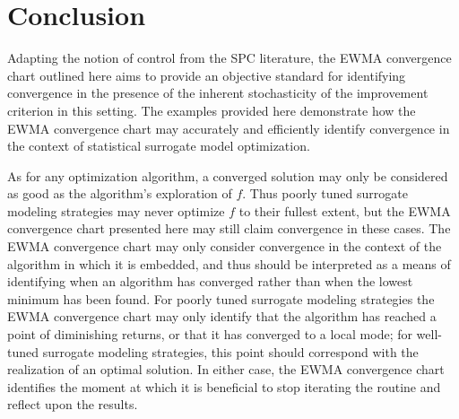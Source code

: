 \documentclass[12pt]{article}
\begin{document}
\clearpage
%
%
\section{Conclusion}
%
%

%
Adapting the notion of control from the SPC literature, the EWMA convergence chart outlined here aims to provide an objective standard for identifying convergence in the presence of the inherent stochasticity of the improvement criterion in this setting. %
%
The examples provided here demonstrate how the EWMA convergence chart may accurately and efficiently identify convergence in the context of statistical surrogate model optimization.

%
%

As for any optimization algorithm, a converged solution may only be considered as good as the algorithm's exploration of $f$. 
%
Thus poorly tuned surrogate modeling strategies may never optimize $f$ to their fullest extent, but the EWMA convergence chart presented here may still claim convergence in these cases. %
%
The EWMA convergence chart may only consider convergence in the context of the algorithm in which it is embedded, and thus should be interpreted as a means of identifying when an algorithm has converged rather than when the lowest minimum has been found. %
%
For poorly tuned surrogate modeling strategies the EWMA convergence chart may only identify that the algorithm has reached a point of diminishing returns, or that it has converged to a local mode; for well-tuned surrogate modeling strategies, this point should correspond with the realization of an optimal solution. 
%
In either case, the EWMA convergence chart identifies the moment at which it is beneficial to stop iterating the routine and reflect upon the results.

%
%

\end{document}

